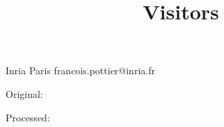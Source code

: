 \documentclass[onecolumn,11pt,nocopyrightspace]{sigplanconf}
\title{Visitors}
\begin{document}
	   {Inria Paris}
	   {francois.pottier@inria.fr}

\maketitle


\clearpage
\tableofcontents
\clearpage


Original:

Processed:
\end{document}
